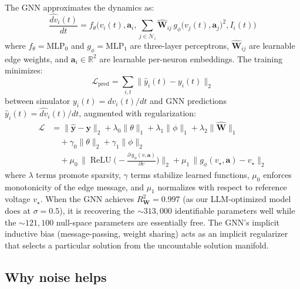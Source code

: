 \documentclass[11pt,a4paper]{article}
\begin{document}
The GNN approximates the dynamics as:
\begin{equation}
\frac{\widehat{dv}_i(t)}{dt}
=f_\theta\Big(
v_i(t),\mathbf{a}_i,
\sum_{j\in\mathcal{N}_i} \widehat{\mathbf{W}}_{ij}\,g_\phi\!\big(v_j(t),\mathbf{a}_j\big)^2,
I_i(t)\Big)
\end{equation}
where $f_\theta = \text{MLP}_0$ and $g_\phi = \text{MLP}_1$ are three-layer perceptrons, $\widehat{\mathbf{W}}_{ij}$ are learnable edge weights, and $\mathbf{a}_i \in \mathbb{R}^2$ are learnable per-neuron embeddings. The training minimizes:
\begin{equation}
\mathcal{L}_{\mathrm{pred}}
= \sum_{i,t}
\big\|
\widehat{y}_i(t) - y_i(t)
\big\|_2
\end{equation}
between simulator $y_i(t) = dv_i(t)/dt$ and GNN predictions $\widehat{y}_i(t) = \widehat{dv}_i(t)/dt$, augmented with regularization:
\begin{equation}
\begin{aligned}
\mathcal{L} &=
\|\widehat{\mathbf y}-\mathbf y\|_2
+ \lambda_0\|\theta\|_{1}
+ \lambda_1\|\phi\|_{1}
+ \lambda_2\|\widehat{\mathbf W}\|_{1} \\
&\quad
+ \gamma_0\|\theta\|_{2}
+ \gamma_1\|\phi\|_{2} \\
&\quad
+ \mu_0\,
\big\|\operatorname{ReLU}\!\big(-\tfrac{\partial\, g_\phi(v,\mathbf{a})}{\partial v}\big)\big\|_2
+ \mu_1\,
\|g_\phi(v_\star,\mathbf{a})-v_\star\|_2
\end{aligned}
\end{equation}
where $\lambda$ terms promote sparsity, $\gamma$ terms stabilize learned functions, $\mu_0$ enforces monotonicity of the edge message, and $\mu_1$ normalizes with respect to reference voltage $v_\star$. When the GNN achieves $R^2_{\mathbf{W}} = 0.997$ (as our LLM-optimized model does at $\sigma = 0.5$), it is recovering the ${\sim}313{,}000$ identifiable parameters well while the ${\sim}121{,}100$ null-space parameters are essentially free. The GNN's implicit inductive bias (message-passing, weight sharing) acts as an implicit regularizer that selects a particular solution from the uncountable solution manifold.

\subsection{Why noise helps}
\end{document}
